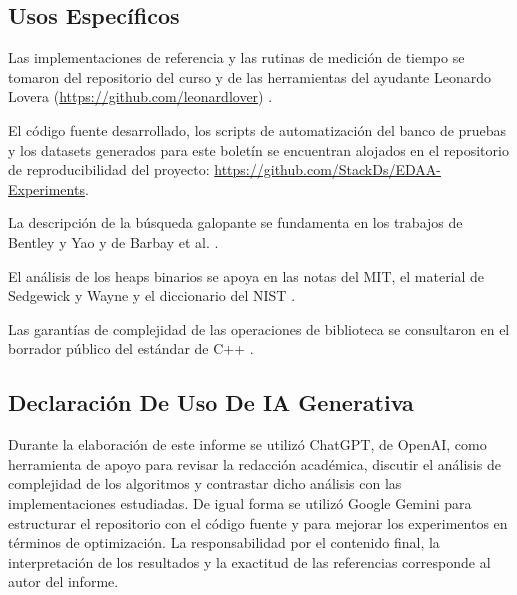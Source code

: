 \documentclass[11pt,letterpaper]{article}
\begin{document}
\subsection{Usos Específicos}
Las implementaciones de referencia y las rutinas de medición de tiempo se tomaron del repositorio del curso \cite{jfuentess_edaa} y de las herramientas del ayudante Leonardo Lovera (\url{https://github.com/leonardlover}) \cite{lovera_github}.

El código fuente desarrollado, los scripts de automatización del banco de pruebas y los datasets generados para este boletín se encuentran alojados en el repositorio de reproducibilidad del proyecto: \url{https://github.com/StackDs/EDAA-Experiments}.

La descripción de la búsqueda galopante se fundamenta en
los trabajos de Bentley y Yao y de Barbay et al.
\cite{bentley1976,barbay2007}.

El análisis de los heaps binarios se apoya en las notas del MIT,
el material de Sedgewick y Wayne y el diccionario del NIST
\cite{demaine2020,sedgewick_priority_queues,nist_binary_heap}.

Las garantías de complejidad de las operaciones de biblioteca
se consultaron en el borrador público del estándar de C++
\cite{cpp_heap_operations,cpp_vector_modifiers}.

\subsection{Declaración De Uso De IA Generativa}
Durante la elaboración de este informe se utilizó ChatGPT, de OpenAI,
como herramienta de apoyo para revisar la redacción académica,
discutir el análisis de complejidad de los algoritmos y contrastar
dicho análisis con las implementaciones estudiadas.
De igual forma se utilizó Google Gemini para estructurar el repositorio con el código fuente y para mejorar los experimentos en términos de optimización.
La responsabilidad por el contenido final, la interpretación de
los resultados y la exactitud de las referencias corresponde
al autor del informe.
\end{document}
